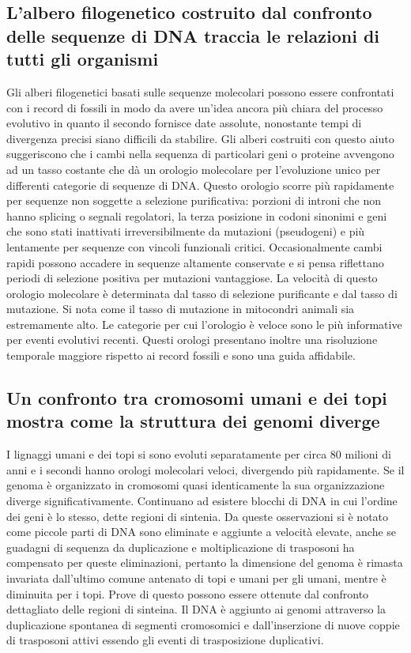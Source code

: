 \subsection{L'albero filogenetico costruito dal confronto delle sequenze di DNA traccia le relazioni di tutti gli organismi}
Gli alberi filogenetici basati sulle sequenze molecolari possono essere confrontati con i record di fossili in modo da avere un'idea ancora pi\`u chiara del processo evolutivo in quanto
il secondo fornisce date assolute, nonostante tempi di divergenza precisi siano difficili da stabilire. Gli alberi costruiti con questo aiuto suggeriscono che i cambi nella sequenza
di particolari geni o proteine avvengono ad un tasso costante che d\`a un orologio molecolare per l'evoluzione unico per differenti categorie di sequenze di DNA. Questo orologio scorre 
pi\`u rapidamente per sequenze non soggette a selezione purificativa: porzioni di introni che non hanno splicing o segnali regolatori, la terza posizione in codoni sinonimi e geni
che sono stati inattivati irreversibilmente da mutazioni (pseudogeni) e pi\`u lentamente per sequenze con vincoli funzionali critici. Occasionalmente cambi rapidi possono accadere in
sequenze altamente conservate e si pensa riflettano periodi di selezione positiva per mutazioni vantaggiose. La velocit\`a di questo orologio molecolare \`e determinata dal tasso di 
selezione purificante e dal tasso di mutazione. Si nota come il tasso di mutazione in mitocondri animali sia estremamente alto. Le categorie per cui l'orologio \`e veloce sono le pi\`u 
informative per eventi evolutivi recenti. Questi orologi presentano inoltre una risoluzione temporale maggiore rispetto ai record fossili e sono una guida affidabile. 
\subsection{Un confronto tra cromosomi umani e dei topi mostra come la struttura dei genomi diverge}
I lignaggi umani e dei topi si sono evoluti separatamente per circa $80$ milioni di anni e i secondi hanno orologi molecolari veloci, divergendo pi\`u rapidamente. Se il genoma \`e 
organizzato in cromosomi quasi identicamente la sua organizzazione diverge significativamente. Continuano ad esistere blocchi di DNA in cui l'ordine dei geni \`e lo stesso, dette regioni
di sintenia. Da queste osservazioni si \`e notato come piccole parti di DNA sono eliminate e aggiunte a velocit\`a elevate, anche se guadagni di sequenza da duplicazione e moltiplicazione
di trasposoni ha compensato per queste eliminazioni, pertanto la dimensione del genoma \`e rimasta invariata dall'ultimo comune antenato di topi e umani per gli umani, mentre \`e 
diminuita per i topi. Prove di questo possono essere ottenute dal confronto dettagliato delle regioni di sinteina. Il DNA \`e aggiunto ai genomi attraverso la duplicazione spontanea
di segmenti cromosomici e dall'inserzione di nuove coppie di trasposoni attivi essendo gli eventi di trasposizione duplicativi. 
